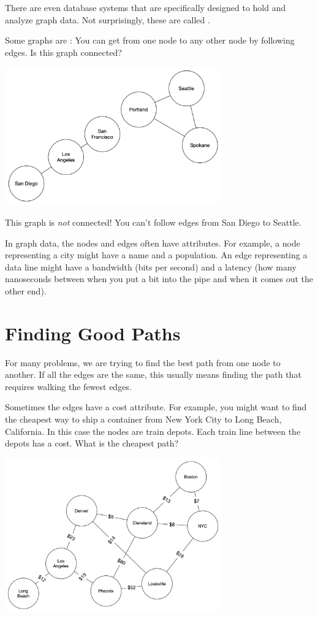 There are even database systems that are specifically designed to hold
and analyze graph data. Not surprisingly, these are called
.

Some graphs are : You can get from one node to any
other node by following edges.  Is this graph connected?

\includegraphics[width=0.7\textwidth]{notconnected.png}

This graph is \textit{not} connected! You can't follow edges from San Diego to Seattle.

In graph data, the nodes and edges often have attributes.  For
example, a node representing a city might have a name and a
population.  An edge representing a data line might have a bandwidth
(bits per second) and a latency (how many nanoseconds between when you
put a bit into the pipe and when it comes out the other end).

\section{Finding Good Paths}

For many problems, we are trying to find the best path from one
node to another.  If all the edges are the same, this usually means
finding the path that requires walking the fewest edges.

Sometimes the edges have a cost attribute.  For example, you might
want to find the cheapest way to ship a container from New York City
to Long Beach, California.  In this case the nodes are train depots.  Each
train line between the depots has a cost.  What is the cheapest path?

\includegraphics[width=0.7\textwidth]{depots.png}

